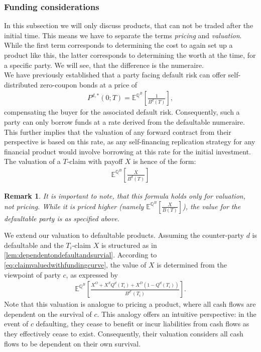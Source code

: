 \documentclass[12pt]{article}
\newtheorem{remark}[theorem]{Remark}
\begin{document}
	\subsubsection{Funding considerations}\label{sec:fundingconsiderations}
	In this subsection we will only discuss products, that can not be traded after the initial time. This means we have to separate the terms \emph{pricing} and \emph{valuation}. While the first term corresponds to determining the cost to again set up a product like this, the latter corresponds to determining the worth at the time, for a specific party. We will see, that the difference is the numeraire.\\
	We have previously established that a party facing default risk can offer self-distributed zero-coupon bonds at a price of
	\begin{align*}
		P^{d,*}(0;T) = \mathbb{E}^{\mathbb{Q}^B}\left[\frac{1}{B^d(T)}\right],
	\end{align*}
	compensating the buyer for the associated default risk. Consequently, such a party can only borrow funds at a rate derived from the defaultable numeraire. This further implies that the valuation of any forward contract from their perspective is based on this rate, as any self-financing replication strategy for any financial product would involve borrowing at this rate for the initial investment. The valuation of a $T$-claim with payoff $X$ is hence of the form:
	\begin{align}\label{eq:claimvaluedwithfundingcurve}
		\mathbb{E}^{\mathbb{Q}^B}\left[\frac{X}{B^d(T)}\right]
	\end{align}
	\begin{remark}
		It is important to note, that this formula holds only for valuation, not pricing. While it is priced higher (namely $\mathbb{E}^{\mathbb{Q}^B}\left[\frac{X}{B(T)}\right]$), the value for the defaultable party is as specified above.
	\end{remark}
	We extend our valuation to defaultable products. Assuming the counter-party $d$ is defaultable and the $T_i$-claim $X$ is structured as in \cref{lem:dependentondefaultandsurvial}. According to \cref{eq:claimvaluedwithfundingcurve}, the value of $X$ is determined from the viewpoint of party $c$, as expressed by
	\begin{align*}
		\mathbb{E}^{\mathbb{Q}^B}\left[ \frac{X^O + X^S Q^d(T_i) + X^D \left(1 - Q^d(T_i)\right)}{B^{d^c}(T_i)} \right].
	\end{align*}
	Note that this valuation is analogue to pricing a product, where all cash flows are dependent on the survival of $c$. This analogy offers an intuitive perspective: in the event of $c$ defaulting, they cease to benefit or incur liabilities from cash flows as they effectively cease to exist. Consequently, their valuation considers all cash flows to be dependent on their own survival.\\
	
\end{document}
